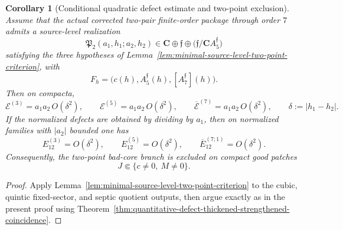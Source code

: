 \documentclass[11pt,a4paper]{amsart}
\theoremstyle{plain}
\newtheorem{corollary}[theorem]{Corollary}
\theoremstyle{definition}
\begin{document}
\begin{corollary}[Conditional quadratic defect estimate and two-point exclusion]
\label{cor:conditional-quadratic-defect-estimate-two-point-exclusion}
Assume that the actual corrected two-pair finite-order package through order $7$
admits a source-level realization
\[
\mathfrak P_2(a_1,h_1;a_2,h_2)
\in
\mathbf C\oplus \mathfrak f\oplus
\bigl(\mathfrak f/\mathbf C A_5^{\mathfrak f}\bigr)
\]
satisfying the three hypotheses of
Lemma~\ref{lem:minimal-source-level-two-point-criterion}, with
\[
F_h=
\bigl(c(h),A_5^{\mathfrak f}(h),[A_7^{\mathfrak f}](h)\bigr).
\]
Then on compacta,
\[
\mathcal E^{(3)}=a_1a_2\,O(\delta^2),
\qquad
\mathcal E^{(5)}=a_1a_2\,O(\delta^2),
\qquad
\overline{\mathcal E}^{(7)}=a_1a_2\,O(\delta^2),
\qquad
\delta:=|h_1-h_2|.
\]
If the normalized defects are obtained by dividing by $a_1$, then on normalized
families with $|a_2|$ bounded one has
\[
E_{12}^{(3)}=O(\delta^2),
\qquad
E_{12}^{(5)}=O(\delta^2),
\qquad
\overline E_{12}^{(7;1)}=O(\delta^2).
\]
Consequently, the two-point bad-core branch is excluded on compact good patches
\[
J\Subset\{c\neq 0,\ M\neq 0\}.
\]
\end{corollary}

\begin{proof}
Apply Lemma~\ref{lem:minimal-source-level-two-point-criterion} to the cubic,
quintic fixed-sector, and septic quotient outputs, then argue exactly as in the
present proof using
Theorem~\ref{thm:quantitative-defect-thickened-strengthened-coincidence}.
\end{proof}
\end{document}
